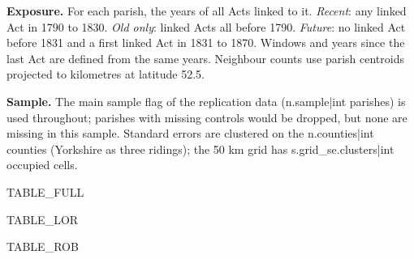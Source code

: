 \documentclass[11pt,a4paper]{article}
\begin{document}
\textbf{Exposure.} For each parish, the years of all Acts linked to it. \textit{Recent}: any linked Act in 1790 to 1830. \textit{Old only}: linked Acts all before 1790. \textit{Future}: no linked Act before 1831 and a first linked Act in 1831 to 1870. Windows and years since the last Act are defined from the same years. Neighbour counts use parish centroids projected to kilometres at latitude 52.5\textdegree.

\textbf{Sample.} The main sample flag of the replication data ({{n.sample|int}} parishes) is used throughout; parishes with missing controls would be dropped, but none are missing in this sample. Standard errors are clustered on the {{n.counties|int}} counties (Yorkshire as three ridings); the 50 km grid has {{s.grid_se.clusters|int}} occupied cells.

{{TABLE_FULL}}

{{TABLE_LOR}}

{{TABLE_ROB}}
\end{document}
